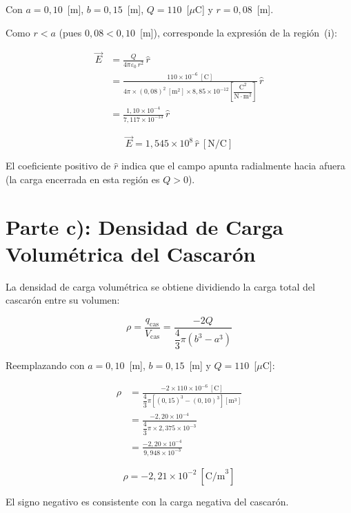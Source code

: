 \documentclass[12pt,letterpaper]{article}
\begin{document}
Con $a = 0{,}10$~[m], $b = 0{,}15$~[m], $Q = 110$~[$\mu$C] y $r = 0{,}08$~[m].

Como $r < a$ (pues $0{,}08 < 0{,}10$~[m]), corresponde la expresi\'on de la regi\'on~(i):

\begin{align*}
    \vec{E} &= \frac{Q}{4\pi\varepsilon_0\,r^2}\,\hat{r} \\[8pt]
            &= \frac{110\times10^{-6}\ [\text{C}]}
                   {4\pi \times (0{,}08)^2\ [\text{m}^2]
                    \times 8{,}85\times10^{-12}
                    \left[\dfrac{\text{C}^2}{\text{N}\cdot\text{m}^2}\right]}\,\hat{r} \\[8pt]
            &= \frac{1{,}10\times10^{-4}}{7{,}117\times10^{-13}}\,\hat{r}
\end{align*}

\[
    \boxed{\vec{E} = 1{,}545 \times 10^{8}\,\hat{r}\ [\text{N/C}]}
\]

El coeficiente positivo de $\hat{r}$ indica que el campo apunta radialmente hacia afuera
(la carga encerrada en esta regi\'on es $Q > 0$).

\section*{Parte c): Densidad de Carga Volum\'etrica del Cascar\'on}

La densidad de carga volum\'etrica se obtiene dividiendo la carga total del cascar\'on
entre su volumen:

\[
    \rho = \frac{q_\text{cas}}{V_\text{cas}}
         = \frac{-2Q}{\dfrac{4}{3}\pi\!\left(b^3 - a^3\right)}
\]

Reemplazando con $a = 0{,}10$~[m], $b = 0{,}15$~[m] y $Q = 110$~[$\mu$C]:

\begin{align*}
    \rho &= \frac{-2 \times 110\times10^{-6}\ [\text{C}]}
                 {\dfrac{4}{3}\pi
                  \!\left[(0{,}15)^3 - (0{,}10)^3\right][\text{m}^3]} \\[10pt]
         &= \frac{-2{,}20\times10^{-4}}
                 {\dfrac{4}{3}\pi \times 2{,}375\times10^{-3}} \\[10pt]
         &= \frac{-2{,}20\times10^{-4}}{9{,}948\times10^{-3}}
\end{align*}

\[
    \boxed{\rho = -2{,}21\times10^{-2}\ [\text{C/m}^3]}
\]

El signo negativo es consistente con la carga negativa del cascar\'on.
\end{document}
